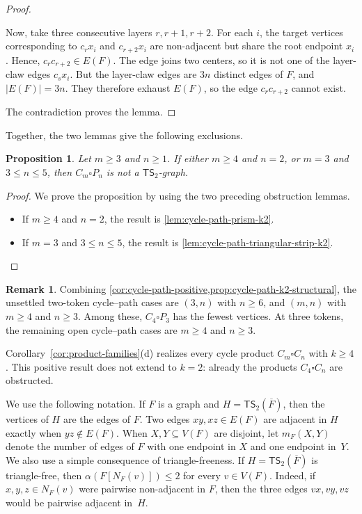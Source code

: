 \documentclass[a4paper]{article}
\theoremstyle{plain}
\newtheorem{proposition}[proposition]{Proposition}
\theoremstyle{definition}
\newtheorem{remark}[remark]{Remark}
\newcommand{\TSsym}{\mathsf{TS}}
\numberwithin{equation}{section}
\begin{document}
\begin{proof}
\begin{itemize}
Now, take three consecutive layers $r,r+1,r+2$.
For each $i$, the target vertices corresponding to $c_r x_i$ and $c_{r+2}x_i$ are non-adjacent but share the root endpoint $x_i$.
Hence, $c_r c_{r+2}\in E(F)$.
The edge joins two centers, so it is not one of the layer-claw edges $c_sx_i$.
But the layer-claw edges are $3n$ distinct edges of $F$, and $|E(F)|=3n$.
They therefore exhaust $E(F)$, so the edge $c_r c_{r+2}$ cannot exist.
\end{itemize}
The contradiction proves the lemma.
\end{proof}

Together, the two lemmas give the following exclusions.

\begin{proposition}
\label{prop:cycle-path-k2-structural}
Let $m\ge 3$ and $n\ge 1$.
If either $m\ge 4$ and $n=2$, or $m=3$ and $3\le n\le 5$, then $C_m\square P_n$ is not a $\TSsym_2$-graph.
\end{proposition}

\begin{proof}
We prove the proposition by using the two preceding obstruction lemmas.
\begin{itemize}
\item If $m\ge 4$ and $n=2$, the result is \cref{lem:cycle-path-prism-k2}.

\item If $m=3$ and $3\le n\le 5$, the result is \cref{lem:cycle-path-triangular-strip-k2}.
\end{itemize}
\end{proof}

\begin{remark}
\label{rem:cycle-path-frontier}
Combining \cref{cor:cycle-path-positive,prop:cycle-path-k2-structural}, the unsettled two-token cycle--path cases are $(3,n)$ with $n\ge 6$, and $(m,n)$ with $m\ge 4$ and $n\ge 3$.
Among these, $C_4\square P_3$ has the fewest vertices.
At three tokens, the remaining open cycle--path cases are $m\ge 4$ and $n\ge 3$.
\end{remark}

Corollary~\ref{cor:product-families}\textup{(d)} realizes every cycle product $C_m\square C_n$ with $k\ge 4$.
This positive result does not extend to $k=2$: already the products $C_4\square C_n$ are obstructed.

We use the following notation.
If $F$ is a graph and $H=\TSsym_2(\overline{F})$, then the vertices of $H$ are the edges of $F$.
Two edges $xy,xz\in E(F)$ are adjacent in $H$ exactly when $yz\notin E(F)$.
When $X,Y\subseteq V(F)$ are disjoint, let $m_F(X,Y)$ denote the number of edges of $F$ with one endpoint in $X$ and one endpoint in~$Y$.
We also use a simple consequence of triangle-freeness.
If $H=\TSsym_2(\overline{F})$ is triangle-free, then $\alpha(F[N_F(v)])\le 2$ for every $v\in V(F)$.
Indeed, if $x,y,z\in N_F(v)$ were pairwise non-adjacent in $F$, then the three edges $vx,vy,vz$ would be pairwise adjacent in~$H$.
\end{document}
